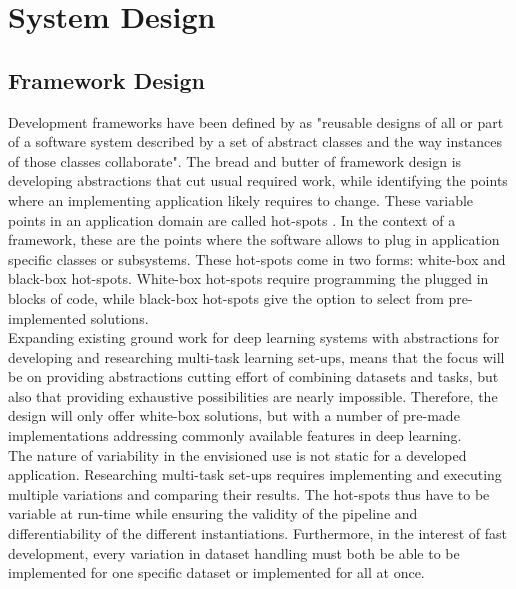 \chapter{System Design} \label{Design}



\section{Framework Design} \label{Design:Framework}

Development frameworks have been defined by \citet{roberts1996evolving} as "reusable designs of all or part of a software system described by a set of abstract classes and the way instances of those classes collaborate". The bread and butter of framework design is developing abstractions that cut usual required work, while identifying the points where an implementing application likely requires to change. These variable points in an application domain are called hot-spots \cite{schmid1997systematic}. In the context of a framework, these are the points where the software allows to plug in application specific classes or subsystems. These hot-spots come in two forms: white-box and black-box hot-spots. White-box hot-spots require programming the plugged in blocks of code, while black-box hot-spots give the option to select from pre-implemented solutions. \\

Expanding existing ground work for deep learning systems with abstractions for developing and researching multi-task learning set-ups, means that the focus will be on providing abstractions cutting effort of combining datasets and tasks, but also that providing exhaustive possibilities are nearly impossible. Therefore, the design will only offer white-box solutions, but with a number of pre-made implementations addressing commonly available features in deep learning.\\

The nature of variability in the envisioned use is not static for a developed application. Researching multi-task set-ups requires implementing and executing multiple variations and comparing their results. The hot-spots thus have to be variable at run-time while ensuring the validity of the pipeline and differentiability of the different instantiations. Furthermore, in the interest of fast development, every variation in dataset handling must both be able to be implemented for one specific dataset or implemented for all at once.\\



